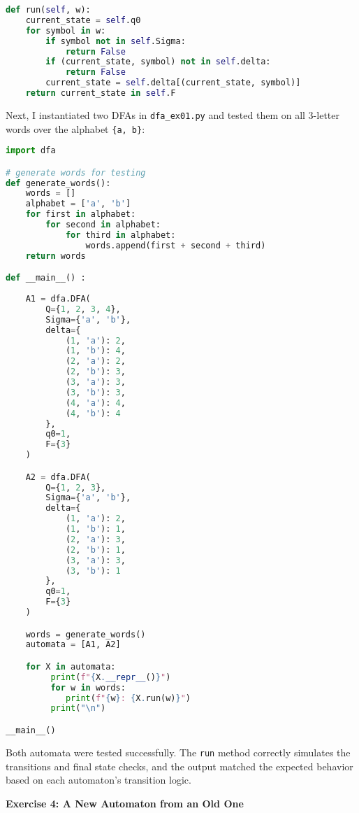 \documentclass{article}
\theoremstyle{theorem}
\theoremstyle{definition}
\theoremstyle{remark}
\begin{document}
\begin{lstlisting}[language=Python]
def run(self, w):
    current_state = self.q0
    for symbol in w:
        if symbol not in self.Sigma:
            return False
        if (current_state, symbol) not in self.delta:
            return False
        current_state = self.delta[(current_state, symbol)]
    return current_state in self.F
\end{lstlisting}

Next, I instantiated two DFAs in \texttt{dfa\_ex01.py} and tested them on all 3-letter words over the alphabet \texttt{\{a, b\}}:

\begin{lstlisting}[language=Python]
import dfa

# generate words for testing
def generate_words():
    words = []
    alphabet = ['a', 'b']
    for first in alphabet:
        for second in alphabet:
            for third in alphabet:
                words.append(first + second + third)
    return words

def __main__() :
    
    A1 = dfa.DFA(
        Q={1, 2, 3, 4},
        Sigma={'a', 'b'},
        delta={
            (1, 'a'): 2,
            (1, 'b'): 4,
            (2, 'a'): 2,
            (2, 'b'): 3,
            (3, 'a'): 3,
            (3, 'b'): 3,
            (4, 'a'): 4,
            (4, 'b'): 4
        },
        q0=1,
        F={3}
    )

    A2 = dfa.DFA(
        Q={1, 2, 3},
        Sigma={'a', 'b'},
        delta={
            (1, 'a'): 2,
            (1, 'b'): 1,
            (2, 'a'): 3,
            (2, 'b'): 1,
            (3, 'a'): 3,
            (3, 'b'): 1
        },
        q0=1,
        F={3}
    )

    words = generate_words()
    automata = [A1, A2]

    for X in automata:
         print(f"{X.__repr__()}")
         for w in words:
            print(f"{w}: {X.run(w)}")
         print("\n")

__main__()
\end{lstlisting}

\vspace{1em}

Both automata were tested successfully. The \texttt{run} method correctly simulates the transitions and final state checks, and the output matched the expected behavior based on each automaton's transition logic.


\textbf{Exercise 4: A New Automaton from an Old One}
\end{document}
